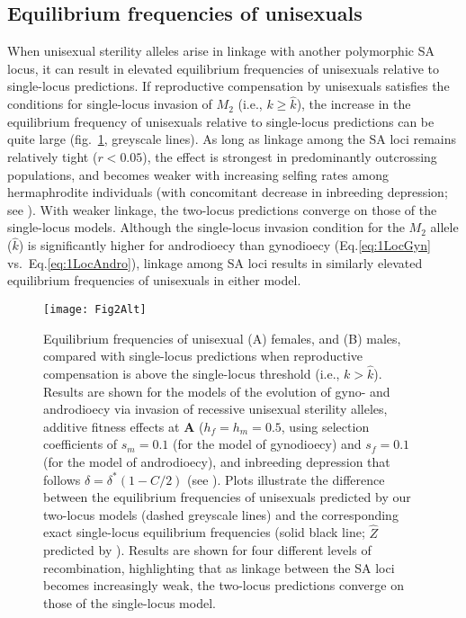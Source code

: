 \documentclass[9pt,twocolumn,twoside,lineno]{gsajnl}
\begin{document}
\subsection{Equilibrium frequencies of unisexuals}

When unisexual sterility alleles arise in linkage with another polymorphic SA locus, it can result in elevated equilibrium frequencies of unisexuals relative to single-locus predictions. If reproductive compensation by unisexuals satisfies the conditions for single-locus invasion of $M_2$ (i.e., $k \geq \hat{k}$), the increase in the equilibrium frequency of unisexuals relative to single-locus predictions can be quite large (fig.~\ref{fig:eqFreq2v1Loc}, greyscale lines). As long as linkage among the SA loci remains relatively tight ($r < 0.05$), the effect is strongest in predominantly outcrossing populations, and becomes weaker with increasing selfing rates among hermaphrodite individuals (with concomitant decrease in inbreeding depression; see ). With weaker linkage, the two-locus predictions converge on those of the single-locus models. Although the single-locus invasion condition for the $M_2$ allele ($\hat{k}$) is significantly higher for androdioecy than gynodioecy (Eq.\ref{eq:1LocGyn} vs.~Eq.\ref{eq:1LocAndro}), linkage among SA loci results in similarly elevated equilibrium frequencies of unisexuals in either model.

\begin{figure}[htbp]
\centering
\texttt{[image: Fig2Alt]}
\caption{Equilibrium frequencies of unisexual (A) females, and (B) males, compared with single-locus predictions when reproductive compensation is above the single-locus threshold (i.e., $k > \hat{k}$). Results are shown for the models of the evolution of gyno- and androdioecy via invasion of recessive unisexual sterility alleles, additive fitness effects at $\mathbf{A}$ ($h_f = h_m = 0.5$, using selection coefficients of $s_m = 0.1$ (for the model of gynodioecy) and $s_f = 0.1$ (for the model of androdioecy), and inbreeding depression that follows $\delta = \delta^\ast(1 - C/2)$ (see ). Plots illustrate the difference between the equilibrium frequencies of unisexuals predicted by our two-locus models (dashed greyscale lines) and the corresponding exact single-locus equilibrium frequencies (solid black line; $\hat{Z}$ predicted by \citealt{Charlesworth1978a}). Results are shown for four different levels of recombination, highlighting that as linkage between the SA loci becomes increasingly weak, the two-locus predictions converge on those of the single-locus model.}
\label{fig:eqFreq2v1Loc}
\end{figure}
\end{document}
